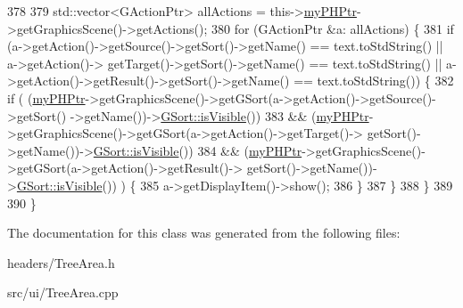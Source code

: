 \begin{DoxyCode}
378 
379     std::vector<GActionPtr> allActions = this->\hyperlink{classTreeArea_a290d659da16085f21c04f81fcd16891c}{myPHPtr}->getGraphicsScene()->getActions();
380     \textcolor{keywordflow}{for} (GActionPtr &a: allActions) \{
381         \textcolor{keywordflow}{if} (a->getAction()->getSource()->getSort()->getName() == text.toStdString() || a->getAction()->
      getTarget()->getSort()->getName() == text.toStdString() || a->getAction()->getResult()->getSort()->getName() == 
      text.toStdString()) \{
382             \textcolor{keywordflow}{if} (       (\hyperlink{classTreeArea_a290d659da16085f21c04f81fcd16891c}{myPHPtr}->getGraphicsScene()->getGSort(a->getAction()->getSource()->getSort()
      ->getName())->\hyperlink{classGSort_a58e2a6099a59b26ffe7dafd90590bd3d}{GSort::isVisible}())
383                        && (\hyperlink{classTreeArea_a290d659da16085f21c04f81fcd16891c}{myPHPtr}->getGraphicsScene()->getGSort(a->getAction()->getTarget()->
      getSort()->getName())->\hyperlink{classGSort_a58e2a6099a59b26ffe7dafd90590bd3d}{GSort::isVisible}())
384                        && (\hyperlink{classTreeArea_a290d659da16085f21c04f81fcd16891c}{myPHPtr}->getGraphicsScene()->getGSort(a->getAction()->getResult()->
      getSort()->getName())->\hyperlink{classGSort_a58e2a6099a59b26ffe7dafd90590bd3d}{GSort::isVisible}()) ) \{
385                 a->getDisplayItem()->show();
386             \}
387         \}
388     \}
389 
390 \}
\end{DoxyCode}


The documentation for this class was generated from the following files\+:\begin{DoxyCompactItemize}
\item 
headers/Tree\+Area.\+h\item 
src/ui/Tree\+Area.\+cpp\end{DoxyCompactItemize}
